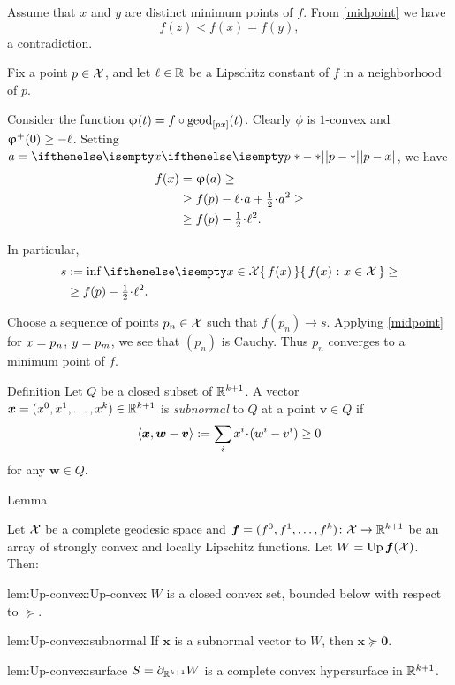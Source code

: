 Assume that $x$ and $y$ are distinct minimum points of $f$. 
From \ref{midpoint} we have
\[f(z)<f(x)=f(y),\] 
a contradiction. 

Fix a point $p\in \spc{X}$, and
let $\Lip\in\RR$ be a Lipschitz constant of $f$ in a neighborhood of $p$.

Consider the function $\phi(t)=f\circ\geod_{[px]}(t)$.
Clearly $\phi$ is $1$-convex and $\phi^+(0)\ge -\Lip$.
Setting $a=\dist{p}{x}{}$, we have 
\begin{align*}
f(x)
&=
\phi(a)
\ge
\\
&\ge
f(p)-\Lip\cdot a+\tfrac{1}{2}\cdot a^2
\ge
\\
&\ge f(p)-\tfrac{1}{2}\cdot{\Lip^2}.
\end{align*}

In particular,
\begin{align*}
s
&\df
\inf\set{f(x)}{x\in \spc{X}}
\ge
\\
&\ge
f(p)-\tfrac{1}{2}\cdot{\Lip^2}.
\end{align*}

Choose a sequence of points $p_n\in \spc{X}$ such that $f(p_n)\to s$.
Applying \ref{midpoint} for $x\z=p_n$, $y\z=p_m$, we see that $(p_n)$ is Cauchy. Thus $p_n$ converges to a minimum point of $f$.
\qeds

\begin{thm}{Definition}
Let $Q$ be a closed subset of $\mathbb{R}^{k+1}$.
A vector $\bm{x}\z=(x^0,x^1,\dots,x^\kay)\in\RR^{\kay+1}$
is \emph{subnormal} to $Q$ at a point $\bm{v}\in Q$ 
if
\[\<\bm{x},\bm{w}-\bm{v}\>
\df
\sum_ix^i\cdot(w^i-v^i)
\ge 0\]
for any $\bm{w}\in Q$.
\end{thm}


\begin{thm}{Lemma}\label{lem:Up-convex}{\sloppy 
Let $\mathcal{X}$ be a complete geodesic space 
and $\bm{f}\z=(f^0,f^1,\dots,f^\kay)\:\spc{X}\to\RR^{\kay+1}$ 
be an array of strongly convex and locally Lipschitz functions.
Let $W=\mathop{\rm Up}\nolimits\bm{f}(\mathcal{X})$.
Then: 

}
\begin{subthm}{lem:Up-convex:Up-convex}
$W$ is a closed convex set, bounded below with respect to $\succcurlyeq$.
\end{subthm}

\begin{subthm}{lem:Up-convex:subnormal}
If $\bm{x}$ is a subnormal vector to $W$, then $\bm{x}\succcurlyeq\bm{0}$.
\end{subthm}

\begin{subthm}{lem:Up-convex:surface}
 $S=\partial_{\mathbb{R}^{k+1}}W$ is a complete convex hypersurface in $\mathbb{R}^{k+1}$.
\end{subthm}

\end{thm}

